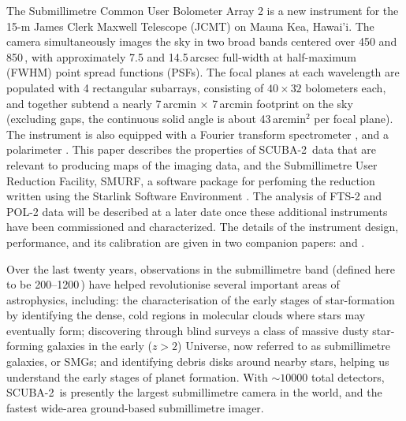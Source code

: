 \documentclass[useAMS,usenatbib,nofootinbib]{mn2e}
\newcommand{\scuba}{SCUBA-2}
\begin{document}


The Submillimetre Common User Bolometer Array 2
\citep[\scuba,][]{2006SPIE.6275E..45H,holland2012} is a new instrument
for the 15-m James Clerk Maxwell Telescope (JCMT) on Mauna Kea,
Hawai'i. The camera simultaneously images the sky in two broad bands
centered over 450 and 850\,\micron, with approximately 7.5 and
14.5\,arcsec full-width at half-maximum (FWHM) point spread functions
(PSFs). The focal planes at each wavelength are populated with 4
rectangular subarrays, consisting of $40 \times 32$ bolometers each,
and together subtend a nearly 7\,arcmin $\times$ 7\,arcmin footprint
on the sky (excluding gaps, the continuous solid angle is about
43\,arcmin$^{2}$ per focal plane).  The instrument is also equipped
with a Fourier transform spectrometer \citep[FTS-2,][]{gom2010}, and a
polarimeter \cite[POL-2,][]{2011ASPC..449...68B}. This paper describes
the properties of \scuba\ data that are relevant to producing maps of
the imaging data, and the Submillimetre User Reduction Facility,
SMURF, a software package for perfoming the reduction written using
the Starlink Software Environment \citep{2009ASPC..411..418J}. The
analysis of FTS-2 and POL-2 data will be described at a later date
once these additional instruments have been commissioned and
characterized. The details of the instrument design, performance, and
its calibration are given in two companion papers: \citet{holland2012}
and \citet{dempsey2012}.

Over the last twenty years, observations in the submillimetre band
(defined here to be 200--1200\,\micron) have helped revolutionise
several important areas of astrophysics, including: the
characterisation of the early stages of star-formation by identifying the
dense, cold regions in molecular clouds where stars may eventually
form; discovering through blind surveys a class of massive dusty
star-forming galaxies in the early ($z>2$) Universe, now referred to
as submillimetre galaxies, or SMGs; and identifying debris disks
around nearby stars, helping us understand the early stages of planet formation.  With
$\sim10000$ total detectors, \scuba\ is presently the largest
submillimetre camera in the world, and the fastest wide-area
ground-based submillimetre imager.
\end{document}
